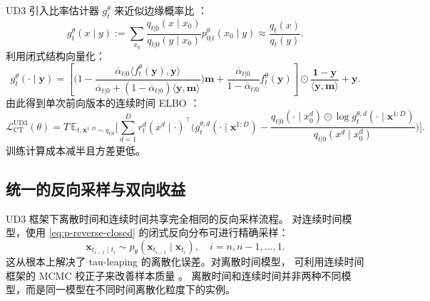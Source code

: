 \documentclass[12pt,a4paper]{ctexbook}
\theoremstyle{definition}
\begin{document}
UD3 引入比率估计器 $g_t^\theta$ 来近似边缘概率比 \cite[§3.1]{zhao2025ud3}：
\begin{equation}
g_t^\theta(x \mid y) := \sum_{x_0} \frac{q_{t|0}(x \mid x_0)}{q_{t|0}(y \mid x_0)} p_{0|t}^\theta(x_0 \mid y) \approx \frac{q_t(x)}{q_t(y)}. \label{eq:g-def}
\end{equation}
利用闭式结构向量化：
\begin{equation}
g_t^\theta(\cdot \mid \boldsymbol{y}) = \left[ \Big(1 - \frac{\overline{\alpha}_{t|0} \langle f_t^\theta(\boldsymbol{y}), \boldsymbol{y} \rangle}{\overline{\alpha}_{t|0} + (1 - \overline{\alpha}_{t|0})\langle \boldsymbol{y}, \mathbf{m} \rangle}\Big) \mathbf{m} + \frac{\overline{\alpha}_{t|0}}{1 - \overline{\alpha}_{t|0}} f_t^\theta(\boldsymbol{y}) \right] \odot \frac{\mathbf{1} - \boldsymbol{y}}{\langle \boldsymbol{y}, \mathbf{m} \rangle} + \boldsymbol{y}. \label{eq:g-closed}
\end{equation}
由此得到单次前向版本的连续时间 ELBO \cite[§3.1 Proposition 3.3]{zhao2025ud3}：
\begin{equation}
\mathcal{L}_{\text{CT}}^{\text{UD3}}(\theta) = T \,\mathbb{E}_{t, \boldsymbol{x}^{1:D} \sim q_{t|0}}\Big[
\sum_{d=1}^D r_t^d(x^d \mid \cdot)^\top \Big(
g_t^{\theta,d}(\cdot \mid \boldsymbol{x}^{1:D}) - \frac{q_{t|0}(\cdot \mid x_0^d) \odot \log g_t^{\theta,d}(\cdot \mid \boldsymbol{x}^{1:D})}{q_{t|0}(x^d \mid x_0^d)}
\Big)
\Big]. \label{eq:elbo-ud3}
\end{equation}
训练计算成本减半且方差更低。

\subsection{统一的反向采样与双向收益}

UD3 框架下离散时间和连续时间共享完全相同的反向采样流程。
对连续时间模型，使用 \eqref{eq:p-reverse-closed} 的闭式反向分布可进行精确采样：
\begin{equation}
\boldsymbol{x}_{t_{i-1} \mid t_i} \sim p_\theta(\boldsymbol{x}_{t_{i-1}} \mid \boldsymbol{x}_{t_i}), \quad i = n, n-1, \dots, 1. \label{eq:unified-sample}
\end{equation}
这从根本上解决了 tau-leaping 的离散化误差。对离散时间模型，
可利用连续时间框架的 MCMC 校正子来改善样本质量 \cite[Appendix A.19]{zhao2025ud3}。
离散时间和连续时间并非两种不同模型，而是同一模型在不同时间离散化粒度下的实例。



\end{document}
